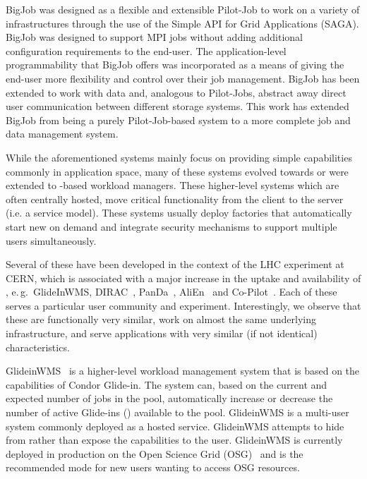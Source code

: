 \documentclass{sig-alternate}
\begin{document}

BigJob was designed as a flexible and extensible Pilot-Job to work on a variety
of infrastructures through the use of the Simple API for Grid Applications
(SAGA). BigJob was designed to support MPI jobs without adding additional
configuration requirements to the end-user. The application-level
programmability that BigJob offers was incorporated as a means of giving the
end-user more flexibility and control over their job management. BigJob has
been extended to work with data and, analogous to Pilot-Jobs, abstract away
direct user communication between different storage systems. This work has
extended BigJob from being a purely Pilot-Job-based system to a more complete
job and data management system.

While the aforementioned systems mainly focus on providing simple \pilot
capabilities commonly in application space, many of these systems evolved
towards or were extended to \pilot-based workload managers.
These higher-level systems which are often centrally hosted, move critical
functionality from the client to the server (i.e. a service model). These
systems usually deploy \pilot factories that automatically start new \pilots on
demand and integrate security mechanisms to support multiple users
simultaneously.

Several of these have been developed in the context of the LHC experiment at
CERN, which is associated with a major increase in the uptake and availability
of \pilots, e.\,g.\ GlideInWMS, DIRAC~\cite{1742-6596-219-6-062049},
PanDa~\cite{1742-6596-331-7-072069}, AliEn~\cite{1742-6596-119-6-062012} and
Co-Pilot~\cite{copilot-tr}. Each of these \pilots serves a particular user
community and experiment. Interestingly, we observe that these \pilots are
functionally very similar, work on almost the same underlying infrastructure,
and serve applications with very similar (if not identical) characteristics.

GlideinWMS~\cite{1742-6596-119-6-062044} is a higher-level workload management
system that is based on the \pilot capabilities of Condor Glide-in. The system
can, based on the current and expected number of jobs in the pool,
automatically increase or decrease the number of active Glide-ins (\pilots)
available to the pool. GlideinWMS is a multi-user \pilotjob system commonly
deployed as a hosted service. GlideinWMS attempts to hide from rather than
expose the \pilot capabilities to the user. GlideinWMS is currently deployed in
production on the Open Science Grid (OSG)~\cite{url_osg} and is the recommended
mode for new users wanting to access OSG resources.
\end{document}
